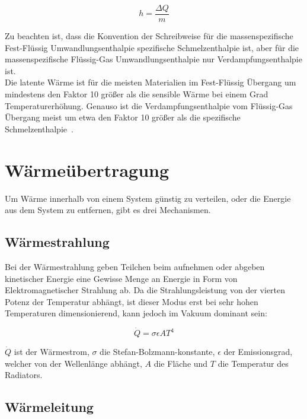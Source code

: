 \begin{equation}
    h = \frac{\Delta Q}{m}
\end{equation}

Zu beachten ist, dass die Konvention der Schreibweise für die massenspezifische Fest-Flüssig Umwandlungsenthalpie spezifische Schmelzenthalpie
ist, aber für die massenspezifische Flüssig-Gas Umwandlungsenthalpie nur Verdampfungsenthalpie ist.\\

Die latente Wärme ist für die meisten Materialien im Fest-Flüssig Übergang um mindestens den Faktor 10 größer als die sensible Wärme bei
einem Grad Temperaturerhöhung. Genauso ist die Verdampfungsenthalpie vom Flüssig-Gas Übergang meist um etwa den Faktor 10 größer als die 
spezifische Schmelzenthalpie~\cite{fusion-vaporization}.

\section{Wärmeübertragung}\label{sec:waermeuebertragung}

Um Wärme innerhalb von einem System günstig zu verteilen, oder die Energie aus dem System zu entfernen, gibt es drei Mechanismen.

\subsection{Wärmestrahlung}\label{sec:strahlung}

Bei der Wärmestrahlung geben Teilchen beim aufnehmen oder abgeben kinetischer Energie eine Gewisse Menge an Energie in Form
von Elektromagnetischer Strahlung ab. Da die Strahlungsleistung von der vierten Potenz der Temperatur
abhängt, ist dieser Modus erst bei sehr hohen Temperaturen dimensionierend, kann jedoch im Vakuum dominant sein:

\begin{equation}
    \label{eq:radiation}
    \dot{Q}=\sigma\epsilon A T^{4}
\end{equation}

$\dot{Q}$ ist der Wärmestrom, $\sigma$ die Stefan-Bolzmann-konstante, $\epsilon$ der Emissionsgrad, welcher von der Wellenlänge
abhängt, $A$ die Fläche und $T$ die Temperatur des Radiators.

\subsection{Wärmeleitung}\label{sec:waermeleitung}

